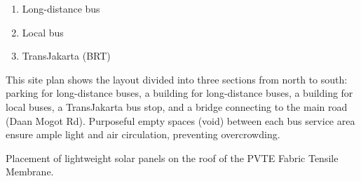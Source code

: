 \begin{minipage}[t]{\linewidth}
\begin{minipage}[t][\ContentHeight][t]{\MinipageBWidth}
\begin{enumerate}[label=\Alph*, itemsep=0.2em, leftmargin=1.2cm]
			\item \hspace{0.3cm}Long-distance bus
			\item \hspace{0.3cm}Local bus
			\item \hspace{0.3cm}TransJakarta (BRT)
		\end{enumerate}
		\vspace{0.25cm}
		This site plan shows the layout divided into three sections from north to south: parking for long-distance buses, a building for long-distance buses, a building for local buses, a TransJakarta bus stop, and a bridge connecting to the main road (Daan Mogot Rd). Purposeful empty spaces (void) between each bus service area ensure ample light and air circulation, preventing overcrowding.
	\end{minipage}
\end{minipage}
\vfill
\begin{minipage}[t]{\linewidth}%
	\def\FigureKalideresIntegratedBusTerminalAerial{%
		\begin{minipage}[t]{\MinipageAWidth}
			
		\end{minipage}
	}
	\def\Figure{\FigureKalideresIntegratedBusTerminalAerial}
	\settototalheight{\ContentHeight}{\Figure}
	\FigureKalideresIntegratedBusTerminalAerial
	\hspace*{\MinipageGap}%
	\begin{minipage}[t][\ContentHeight][t]{\MinipageBWidth}
		\vfill
		Placement of lightweight solar panels on the roof of the PVTE Fabric Tensile Membrane.
		\vspace{16pt}%
		\vspace{3pt}%
	\end{minipage}
\end{minipage}
\EndTwoColumnLayoutEndMulticolsTwo %
\newpage
\noindent
